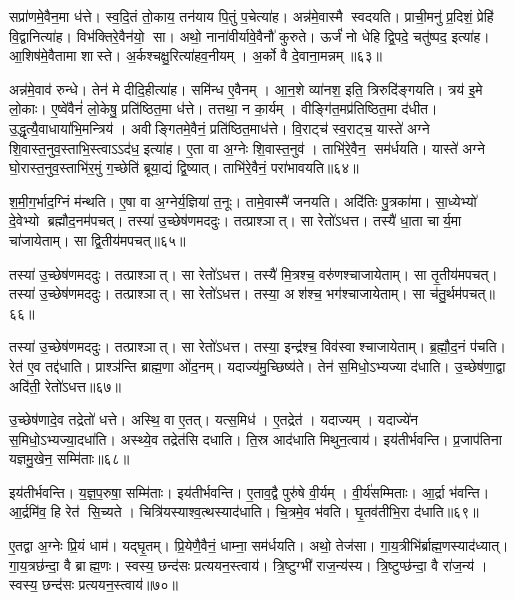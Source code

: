 सप्रा॑णमे॒वैन॒मा ध॑त्ते।
स्व॒दि॒तं तो॒काय॒ तन॑याय पि॒तुं प॒चेत्या॑ह।
अन्न॑मे॒वास्मै स्वदयति।
प्राची॒मनु॑ प्र॒दिशं॒ प्रेहि॑ वि॒द्वानित्या॑ह।
विभ॑क्तिरे॒वैन॑यो॒ सा।
अथो॒ नाना॑वीर्यावे॒वैनौ॑ कुरुते।
ऊर्जं॑ नो धेहि द्वि॒पदे॒ चतु॑ष्पद॒ इत्या॑ह।
आ॒शिष॑मे॒वैतामा शास्ते।
अ॒र्कश्चक्षु॒रित्या॑हव॒नीयम्।
अ॒र्को वै दे॒वाना॒मन्नम्॥६३॥

अन्न॑मे॒वाव॑ रुन्धे।
तेन॑ मे दीदि॒हीत्या॑ह।
समि॑न्ध ए॒वैनम्।
आ॒न॒शे व्या॑नश॒ इति॒ त्रिरुदि॑ङ्गयति।
त्रय॑ इ॒मे लो॒काः।
ए॒ष्वे॑वैनं॑ लो॒केषु॒ प्रति॑ष्ठित॒मा ध॑त्ते।
तत्तथा॒ न का॒र्यम्।
वीङ्गि॑त॒मप्र॑तिष्ठित॒मा द॑धीत।
उ॒द्धृत्यै॒वाधाया॑भि॒मन्त्रिय॑।
अवीङ्गितमे॒वैनं॒ प्रति॑ष्ठित॒माध॑त्ते।
वि॒राट्च॑ स्व॒राट्च॒ यास्ते॑ अग्ने शि॒वास्त॒नुव॒स्ताभि॒स्त्वाऽऽद॑ध॒ इत्या॑ह।
ए॒ता वा अ॒ग्नेः शि॒वास्त॒नुव॑।
ताभि॑रे॒वैन॒ सम॑र्धयति।
यास्ते॑ अग्ने घो॒रास्त॒नुव॒स्ताभि॑र॒मुं ग॒च्छेति॑ ब्रूया॒द्यं द्वि॒ष्यात्।
ताभि॑रे॒वैनं॒ परा॑भावयति॥६४॥\anuvakamend[लो॒को॑ऽसृजतैन॒माध॑त्तेऽन्वाहार्य॒पच॑नं दे॒वाना॒मन्न॑मेनं॒ प्रति॑ष्ठित॒माध॑त्ते॒ पञ्च॑ च]

श॒मी॒ग॒र्भाद॒ग्निं म॑न्थति।
ए॒षा वा अ॒ग्नेर्य॒ज्ञिया॑ त॒नूः।
तामे॒वास्मै॑ जनयति।
अदि॑तिः पु॒त्रका॑मा।
सा॒ध्येभ्यो॑ दे॒वेभ्यो ब्रह्मौद॒नम॑पचत्।
तस्या॑ उ॒च्छेष॑णमददुः।
तत्प्राश्ञात्।
सा रेतो॑ऽधत्त।
तस्यै॑ धा॒ता चार्य॒मा चा॑जायेताम्।
सा द्वि॒तीय॑मपचत्॥६५॥

तस्या॑ उ॒च्छेष॑णमददुः।
तत्प्राश्ञात्।
सा रेतो॑ऽधत्त।
तस्यै॑ मि॒त्रश्च॒ वरु॑णश्चाजायेताम्।
सा तृ॒तीय॑मपचत्।
तस्या॑ उ॒च्छेष॑णमददुः।
तत्प्राश्ञात्।
सा रेतो॑ऽधत्त।
तस्या॒ अश॑श्च॒ भग॑श्चाजायेताम्।
सा च॑तु॒र्थम॑पचत्॥६६॥

तस्या॑ उ॒च्छेष॑णमददुः।
तत्प्राश्ञात्।
सा रेतो॑ऽधत्त।
तस्या॒ इन्द्र॑श्च॒ विव॑स्वाश्चाजायेताम्।
ब्र॒ह्मौ॒द॒नं प॑चति।
रेत॑ ए॒व तद्द॑धाति।
प्राश्ञ॑न्ति ब्राह्म॒णा ओ॑द॒नम्।
यदाज्य॑मु॒च्छिष्य॑ते।
तेन॑ स॒मिधो॒ऽभ्यज्या द॑धाति।
उ॒च्छेष॑णा॒द्वा अदि॑ती॒ रेतो॑ऽधत्त॥६७॥

उ॒च्छेष॑णादे॒व तद्रेतो॑ धत्ते।
अस्थि॒ वा ए॒तत्।
यत्स॒मिध॑।
ए॒तद्रेत॑।
यदाज्यम्।
यदाज्ये॑न स॒मिधो॒ऽभ्यज्या॒दधा॑ति।
अस्थ्ये॒व तद्रेत॑सि दधाति।
ति॒स्र आद॑धाति मिथुन॒त्वाय॑।
इय॑तीर्भवन्ति।
प्र॒जाप॑तिना यज्ञमु॒खेन॒ सम्मि॑ताः॥६८॥

इय॑तीर्भवन्ति।
य॒ज्ञ॒प॒रुषा॒ सम्मि॑ताः।
इय॑तीर्भवन्ति।
ए॒ताव॒द्वै पुरु॑षे वी॒र्यम्।
वी॒र्य॑सम्मिताः।
आ॒र्द्रा भ॑वन्ति।
आ॒र्द्रमि॑व॒ हि रेत॑ सि॒च्यते।
चित्रि॑यस्याश्व॒त्थस्याद॑धाति।
चि॒त्रमे॒व भ॑वति।
घृ॒तव॑तीभि॒रा द॑धाति॥६९॥

ए॒तद्वा अ॒ग्नेः प्रि॒यं धाम॑।
यद्घृ॒तम्।
प्रि॒येणै॒वैनं॒ धाम्ना॒ सम॑र्धयति।
अथो॒ तेज॑सा।
गा॒य॒त्रीभि॑र्ब्राह्म॒णस्याद॑ध्यात्।
गा॒य॒त्रछ॑न्दा॒ वै ब्राह्म॒णः।
स्वस्य॒ छन्द॑सः प्रत्ययन॒स्त्वाय॑।
त्रि॒ष्टुग्भी॑ राज॒न्य॑स्य।
त्रि॒ष्टुप्छ॑न्दा॒ वै रा॑ज॒न्य॑।
स्वस्य॒ छन्द॑सः प्रत्ययन॒स्त्वाय॑॥७०॥

